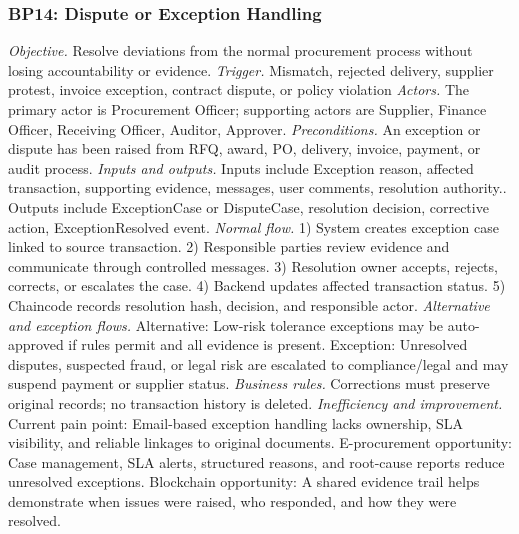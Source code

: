 \documentclass[conference]{IEEEtran}
\begin{document}
\subsubsection{BP14: Dispute or Exception Handling}
\textit{Objective.} Resolve deviations from the normal procurement process without losing accountability or evidence.
\textit{Trigger.} Mismatch, rejected delivery, supplier protest, invoice exception, contract dispute, or policy violation
\textit{Actors.} The primary actor is Procurement Officer; supporting actors are Supplier, Finance Officer, Receiving Officer, Auditor, Approver.
\textit{Preconditions.} An exception or dispute has been raised from RFQ, award, PO, delivery, invoice, payment, or audit process.
\textit{Inputs and outputs.} Inputs include Exception reason, affected transaction, supporting evidence, messages, user comments, resolution authority.. Outputs include ExceptionCase or DisputeCase, resolution decision, corrective action, ExceptionResolved event.
\textit{Normal flow.} 1) System creates exception case linked to source transaction. 2) Responsible parties review evidence and communicate through controlled messages. 3) Resolution owner accepts, rejects, corrects, or escalates the case. 4) Backend updates affected transaction status. 5) Chaincode records resolution hash, decision, and responsible actor.
\textit{Alternative and exception flows.} Alternative: Low-risk tolerance exceptions may be auto-approved if rules permit and all evidence is present. Exception: Unresolved disputes, suspected fraud, or legal risk are escalated to compliance/legal and may suspend payment or supplier status.
\textit{Business rules.} Corrections must preserve original records; no transaction history is deleted.
\textit{Inefficiency and improvement.} Current pain point: Email-based exception handling lacks ownership, SLA visibility, and reliable linkages to original documents. E-procurement opportunity: Case management, SLA alerts, structured reasons, and root-cause reports reduce unresolved exceptions. Blockchain opportunity: A shared evidence trail helps demonstrate when issues were raised, who responded, and how they were resolved.
\end{document}
